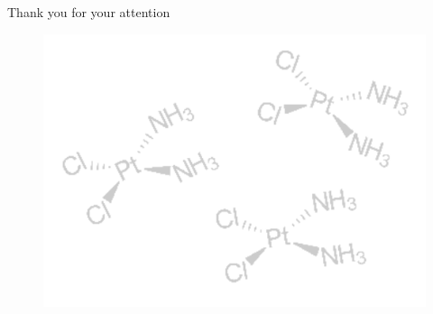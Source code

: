 \documentclass{beamer}
\begin{document}




\begin{frame} %
	\begin{center}
		\bigskip\bigskip %
		{\Huge Thank you for your attention \faHeart}
		\begin{figure}
			\centering
			\includegraphics[scale=0.3]{figures/cis-platin.pdf}
		\end{figure}
	\end{center}
\end{frame} 
\end{document}
